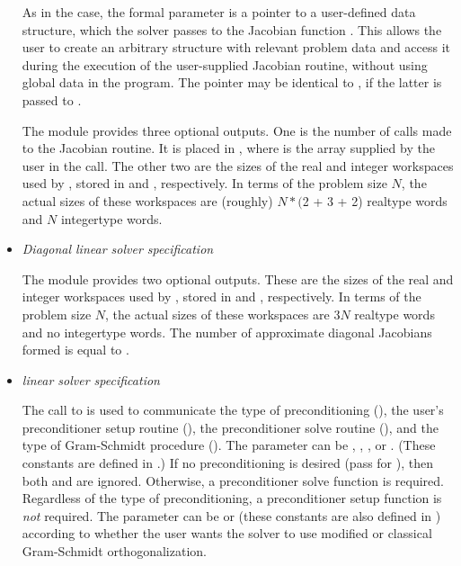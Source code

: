 \begin{itemize}
  As
  in the {\cvdense} case, the  formal parameter
   is a pointer to a user-defined data structure, which
  the {\cvband} solver passes to the Jacobian function .  This
  allows the user to create an arbitrary structure with relevant problem
  data and access it during the execution of the user-supplied Jacobian
  routine, without using global data in the program.  The pointer
   may be identical to , if the latter is
  passed to .
  
  The {\cvband} module provides three optional outputs.
  One is the number of calls made to the Jacobian routine. It is placed
  in \id{iopt[}\id{]}, where  is the array supplied by the
  user in the  call.  The other two are the sizes of the
  real and integer workspaces used by {\cvband}, stored in
  \id{iopt[}\id{]} and \id{iopt[}\id{]},
  respectively.
  In  terms of the problem
  size $N$, the actual sizes of these workspaces are (roughly)
  $N*($2  + 3  + 2) realtype words and $N$ integertype
  words.
%
%
\item {\em Diagonal linear solver specification}
  
  
  The {\cvdiag} module provides two optional outputs.
  These are the sizes of the real and integer workspaces used by {\cvdiag}, stored in
  \id{iopt[}\id{]} and \id{iopt[}\id{]},
  respectively.
  In terms of the
  problem size $N$, the actual sizes of these workspaces are
  $3N$ realtype words and no integertype words. The number of approximate
  diagonal Jacobians formed is equal to .
%
%
\item {\em {\spgmr} linear solver specification}
  
  The call to  is used to communicate the type of
  preconditioning (), the user's preconditioner setup
  routine (), the preconditioner solve routine (),
  and the type of Gram-Schmidt procedure (). The 
  parameter can be , , , or .
  (These constants are defined in .)  If no preconditioning
  is desired (pass  for ), then both  and
   are ignored.  Otherwise, a preconditioner solve function
   is required.  Regardless of the type of preconditioning,
  a preconditioner setup function  is {\em not} required. 
  The  parameter can be  or 
  (these constants are also defined in ) according to
  whether the user wants the {\cvspgmr} solver to use modified or classical
  Gram-Schmidt orthogonalization.
  

\end{itemize}

